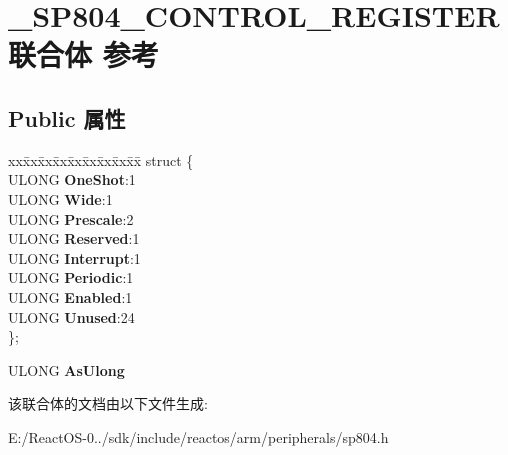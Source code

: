 \hypertarget{union___s_p804___c_o_n_t_r_o_l___r_e_g_i_s_t_e_r}{}\section{\+\_\+\+S\+P804\+\_\+\+C\+O\+N\+T\+R\+O\+L\+\_\+\+R\+E\+G\+I\+S\+T\+E\+R联合体 参考}
\label{union___s_p804___c_o_n_t_r_o_l___r_e_g_i_s_t_e_r}
\subsection*{Public 属性}
\begin{DoxyCompactItemize}
\item 
\mbox{\label{union___s_p804___c_o_n_t_r_o_l___r_e_g_i_s_t_e_r_a5c36d00057250d96f9e520765055d632}} 
\begin{tabbing}
xx\=xx\=xx\=xx\=xx\=xx\=xx\=xx\=xx\=\kill
struct \{\\
\>ULONG {\bfseries OneShot}:1\\
\>ULONG {\bfseries Wide}:1\\
\>ULONG {\bfseries Prescale}:2\\
\>ULONG {\bfseries Reserved}:1\\
\>ULONG {\bfseries Interrupt}:1\\
\>ULONG {\bfseries Periodic}:1\\
\>ULONG {\bfseries Enabled}:1\\
\>ULONG {\bfseries Unused}:24\\
\}; \\

\end{tabbing}\item 
\mbox{\label{union___s_p804___c_o_n_t_r_o_l___r_e_g_i_s_t_e_r_aeb20afc38bc7faef056a50320d9ba14e}} 
U\+L\+O\+NG {\bfseries As\+Ulong}
\end{DoxyCompactItemize}


该联合体的文档由以下文件生成\+:\begin{DoxyCompactItemize}
\item 
E\+:/\+React\+O\+S-\/0../sdk/include/reactos/arm/peripherals/sp804.\+h\end{DoxyCompactItemize}
